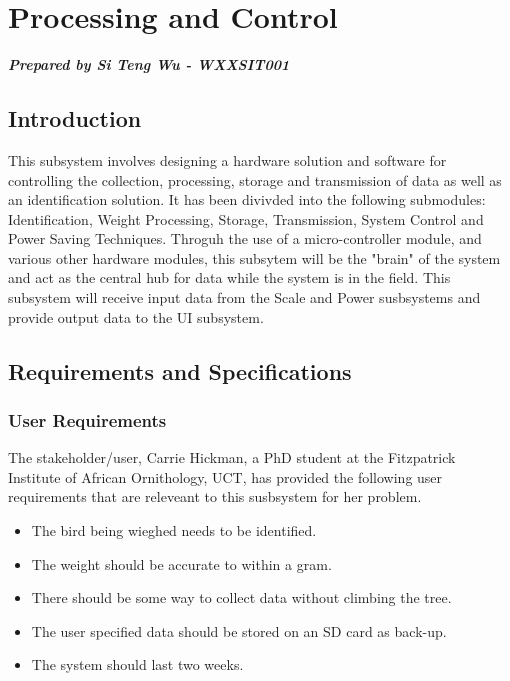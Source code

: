 \documentclass[class=report,11pt,crop=false]{standalone}
\begin{document}
\chapter{Processing and Control}

\textbf{\textit{Prepared by Si Teng Wu - WXXSIT001}}
\vspace{0.5cm}
\section{Introduction}
This subsystem involves designing a hardware solution and software for controlling the collection, processing, storage and transmission of data as well as an identification solution. It has been divivded into the following submodules: Identification, Weight Processing, Storage, Transmission, System Control and Power Saving Techniques. Throguh the use of a micro-controller module, and various other hardware modules, this subsytem will be the "brain" of the system and act as the central hub for data while the system is in the field. This subsystem will receive input data from the Scale and Power susbsystems and provide output data to the UI subsystem.

\section{Requirements and Specifications}
\subsection*{User Requirements}
The stakeholder/user, Carrie Hickman, a PhD student at the Fitzpatrick Institute of African Ornithology, UCT, has provided the following user requirements that are releveant to this susbsystem for her problem. %
\begin{itemize}
    \item The bird being wieghed needs to be identified.
    \item The weight should be accurate to within a gram.
    \item There should be some way to collect data without climbing the tree.
    \item The user specified data should be stored on an SD card as back-up.
    \item The system should last two weeks.
\end{itemize}
\end{document}
